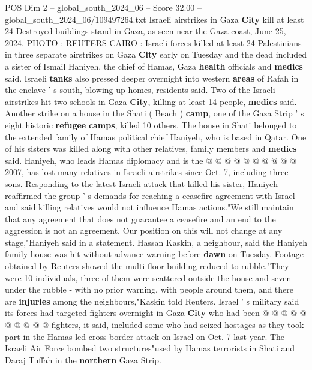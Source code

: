 \begin{textsample}{POS Dim 2 – global\_south\_2024\_06 – Score 32.00 – global\_south\_2024\_06/109497264.txt}  \label{ex:f2_pos_051}
Israeli airstrikes in Gaza \textbf{City} kill at least 24 Destroyed buildings stand in Gaza, as seen near the Gaza coast, June 25, 2024.
PHOTO : REUTERS CAIRO : Israeli forces killed at least 24 Palestinians in three separate airstrikes on Gaza \textbf{City} early on Tuesday and the dead included a sister of Ismail Haniyeh, the chief of Hamas, Gaza \textbf{health} officials and \textbf{medics} said.
Israeli \textbf{tanks} also pressed deeper overnight into western \textbf{areas} of Rafah in the enclave ' s south, blowing up homes, residents said.
Two of the Israeli airstrikes hit two schools in Gaza \textbf{City}, killing at least 14 people, \textbf{medics} said.
Another strike on a house in the Shati ( Beach ) \textbf{camp}, one of the Gaza Strip ' s eight historic \textbf{refugee} \textbf{camps}, killed 10 others.
The house in Shati belonged to the extended family of Hamas political chief Haniyeh, who is based in Qatar.
One of his sisters was killed along with other relatives, family members and \textbf{medics} said.
Haniyeh, who leads Hamas diplomacy and is the @ @ @ @ @ @ @ @ @ @ 2007, has lost many relatives in Israeli airstrikes since Oct. 7, including three sons.
Responding to the latest Israeli attack that killed his sister, Haniyeh reaffirmed the group ' s demands for reaching a ceasefire agreement with Israel and said killing relatives would not influence Hamas actions."We still maintain that any agreement that does not guarantee a ceasefire and an end to the aggression is not an agreement.
Our position on this will not change at any stage,"Haniyeh said in a statement.
Hassan Kaskin, a neighbour, said the Haniyeh family house was hit without advance warning before \textbf{dawn} on Tuesday.
Footage obtained by Reuters showed the multi-floor building reduced to rubble."They were 10 individuals, three of them were scattered outside the house and seven under the rubble - with no prior warning, with people around them, and there are \textbf{injuries} among the neighbours,"Kaskin told Reuters.
Israel ' s military said its forces had targeted fighters overnight in Gaza \textbf{City} who had been @ @ @ @ @ @ @ @ @ @ fighters, it said, included some who had seized hostages as they took part in the Hamas-led cross-border attack on Israel on Oct. 7 last year.
The Israeli Air Force bombed two structures"used by Hamas terrorists in Shati and Daraj Tuffah in the \textbf{northern} Gaza Strip.

\end{textsample}
